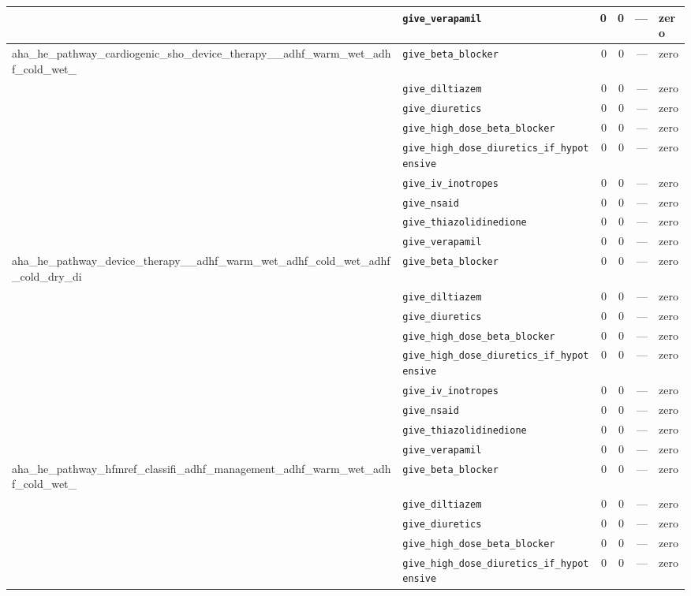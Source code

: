 \begin{table}[ht]
\begin{tabular}{llrrrl}
 & \texttt{give\_verapamil} & 0 & 0 & — & zero \\
\midrule
aha\_he\_pathway\_cardiogenic\_sho\_device\_therapy\_\_adhf\_warm\_wet\_adhf\_cold\_wet\_ & \texttt{give\_beta\_blocker} & 0 & 0 & — & zero \\
 & \texttt{give\_diltiazem} & 0 & 0 & — & zero \\
 & \texttt{give\_diuretics} & 0 & 0 & — & zero \\
 & \texttt{give\_high\_dose\_beta\_blocker} & 0 & 0 & — & zero \\
 & \texttt{give\_high\_dose\_diuretics\_if\_hypotensive} & 0 & 0 & — & zero \\
 & \texttt{give\_iv\_inotropes} & 0 & 0 & — & zero \\
 & \texttt{give\_nsaid} & 0 & 0 & — & zero \\
 & \texttt{give\_thiazolidinedione} & 0 & 0 & — & zero \\
 & \texttt{give\_verapamil} & 0 & 0 & — & zero \\
\midrule
aha\_he\_pathway\_device\_therapy\_\_adhf\_warm\_wet\_adhf\_cold\_wet\_adhf\_cold\_dry\_di & \texttt{give\_beta\_blocker} & 0 & 0 & — & zero \\
 & \texttt{give\_diltiazem} & 0 & 0 & — & zero \\
 & \texttt{give\_diuretics} & 0 & 0 & — & zero \\
 & \texttt{give\_high\_dose\_beta\_blocker} & 0 & 0 & — & zero \\
 & \texttt{give\_high\_dose\_diuretics\_if\_hypotensive} & 0 & 0 & — & zero \\
 & \texttt{give\_iv\_inotropes} & 0 & 0 & — & zero \\
 & \texttt{give\_nsaid} & 0 & 0 & — & zero \\
 & \texttt{give\_thiazolidinedione} & 0 & 0 & — & zero \\
 & \texttt{give\_verapamil} & 0 & 0 & — & zero \\
\midrule
aha\_he\_pathway\_hfmref\_classifi\_adhf\_management\_adhf\_warm\_wet\_adhf\_cold\_wet\_ & \texttt{give\_beta\_blocker} & 0 & 0 & — & zero \\
 & \texttt{give\_diltiazem} & 0 & 0 & — & zero \\
 & \texttt{give\_diuretics} & 0 & 0 & — & zero \\
 & \texttt{give\_high\_dose\_beta\_blocker} & 0 & 0 & — & zero \\
 & \texttt{give\_high\_dose\_diuretics\_if\_hypotensive} & 0 & 0 & — & zero \\

\end{tabular}
\end{table}
